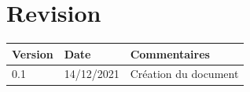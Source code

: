 \documentclass[a4paper, twoside, 12pt]{report}
\title{\titleOfDoc}
\author{\authors}
\begin{document}


\chapter*{Revision}
\begin{table}[!ht] %
	\begin{tabular}{ | m{3cm} | m{3cm}| m{8cm} | } 
		\hline
		\textbf{Version} & \textbf{Date} & \textbf{Commentaires} \\
		\hline
			0.1 & 14/12/2021 & Création du document \\
		\hline
	\end{tabular}
\end{table}

\tableofcontents
\newpage



%
%
\end{document}

